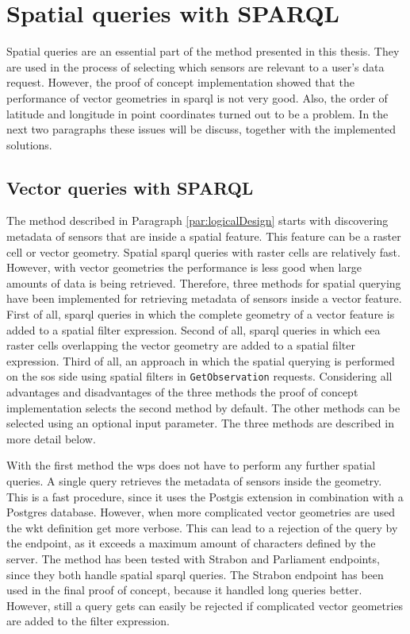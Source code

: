 \section{Spatial queries with SPARQL}
\label{par:spQueries}
Spatial queries are an essential part of the method presented in this thesis. They are used in the process of selecting which sensors are relevant to a user's data request. However, the proof of concept implementation showed that the performance of vector geometries in \ac{sparql} is not very good. Also, the order of latitude and longitude in point coordinates turned out to be a problem. In the next two paragraphs these issues will be discuss, together with the implemented solutions.     

\subsection{Vector queries with SPARQL}
The method described in Paragraph \ref{par:logicalDesign} starts with discovering metadata of sensors that are inside a spatial feature. This feature can be a raster cell or vector geometry. Spatial \ac{sparql} queries with raster cells are relatively fast. However, with vector geometries the performance is less good when large amounts of data is being retrieved. Therefore, three methods for spatial querying have been implemented for retrieving metadata of sensors inside a vector feature. First of all, \ac{sparql} queries in which the complete geometry of a vector feature is added to a spatial filter expression. Second of all, \ac{sparql} queries in which \ac{eea} raster cells overlapping the vector geometry are added to a spatial filter expression. Third of all, an approach in which the spatial querying is performed on the \ac{sos} side using spatial filters in \texttt{GetObservation} requests. Considering all advantages and disadvantages of the three methods the proof of concept implementation selects the second method by default. The other methods can be selected using an optional input parameter. The three methods are described in more detail below.

With the first method the \ac{wps} does not have to perform any further spatial queries. A single query retrieves the metadata of sensors inside the geometry. This is a fast procedure, since it uses the Postgis extension in combination with a Postgres database. However, when more complicated vector geometries are used the \ac{wkt} definition get more verbose. This can lead to a rejection of the query by the endpoint, as it exceeds a maximum amount of characters defined by the server. The method has been tested with Strabon and Parliament endpoints, since they both handle spatial \ac{sparql} queries. The Strabon endpoint has been used in the final proof of concept, because it handled long queries better. However, still a query gets can easily be rejected if complicated vector geometries are added to the filter expression.    

